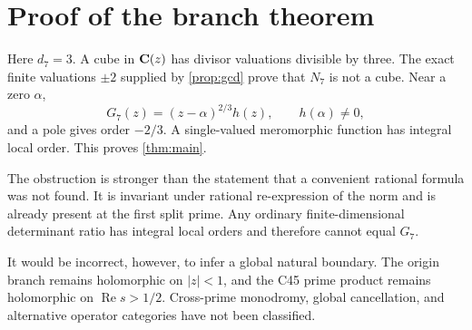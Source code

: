 \section{Proof of the branch theorem}

Here $d_7=3$.  A cube in $\mathbf C(z)$ has divisor valuations divisible by three.
The exact finite valuations $\pm2$ supplied by \cref{prop:gcd} prove that
$N_7$ is not a cube.  Near a zero $\alpha$,
\[
 G_7(z)=(z-\alpha)^{2/3}h(z),
 \qquad h(\alpha)\ne0,
\]
and a pole gives order $-2/3$.  A single-valued meromorphic function has
integral local order.  This proves \cref{thm:main}.

The obstruction is stronger than the statement that a convenient rational
formula was not found.  It is invariant under rational re-expression of the
norm and is already present at the first split prime.  Any ordinary
finite-dimensional determinant ratio has integral local orders and therefore
cannot equal $G_7$.

It would be incorrect, however, to infer a global natural boundary.  The
origin branch remains holomorphic on $|z|<1$, and the C45 prime product remains
holomorphic on $\operatorname{Re}s>1/2$.  Cross-prime monodromy, global
cancellation, and alternative operator categories have not been classified.
